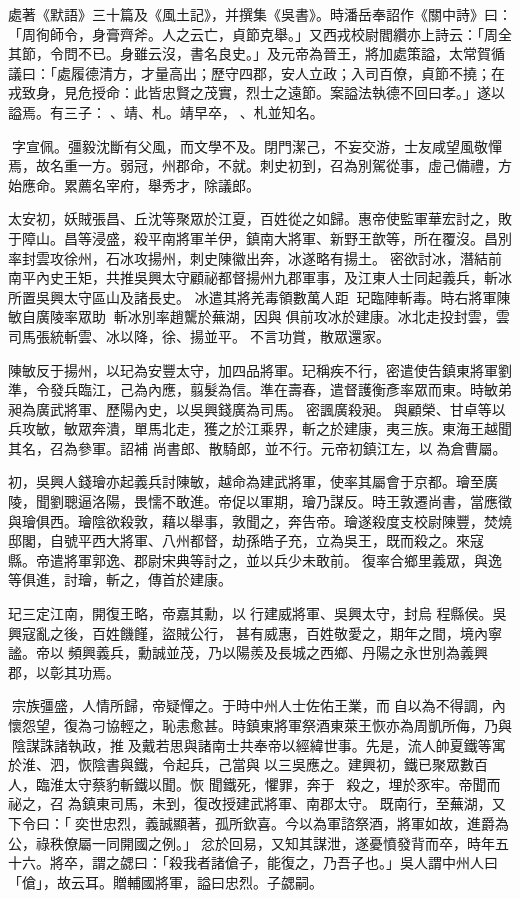 \begin{pinyinscope}
 處著《默語》三十篇及《風土記》，并撰集《吳書》。時潘岳奉詔作《關中詩》曰：「周徇師令，身膏齊斧。人之云亡，貞節克舉。」又西戎校尉閻纘亦上詩云：「周全其節，令問不已。身雖云沒，書名良史。」及元帝為晉王，將加處策謚，太常賀循議曰：「處履德清方，才量高出；歷守四郡，安人立政；入司百僚，貞節不撓；在戎致身，見危授命：此皆忠賢之茂實，烈士之遠節。案謚法執德不回曰孝。」遂以謚焉。有三子：、靖、札。靖早卒，、札並知名。



 字宣佩。彊毅沈斷有父風，而文學不及。閉門潔己，不妄交游，士友咸望風敬憚焉，故名重一方。弱冠，州郡命，不就。刺史初到，召為別駕從事，虛己備禮，方始應命。累薦名宰府，舉秀才，除議郎。



 太安初，妖賊張昌、丘沈等聚眾於江夏，百姓從之如歸。惠帝使監軍華宏討之，敗于障山。昌等浸盛，殺平南將軍羊伊，鎮南大將軍、新野王歆等，所在覆沒。昌別率封雲攻徐州，石冰攻揚州，刺史陳徽出奔，冰遂略有揚土。密欲討冰，潛結前南平內史王矩，共推吳興太守顧祕都督揚州九郡軍事，及江東人士同起義兵，斬冰所置吳興太守區山及諸長史。
 冰遣其將羌毒領數萬人距，玘臨陣斬毒。時右將軍陳敏自廣陵率眾助，斬冰別率趙驡於蕪湖，因與俱前攻冰於建康。冰北走投封雲，雲司馬張統斬雲、冰以降，徐、揚並平。不言功賞，散眾還家。



 陳敏反于揚州，以玘為安豐太守，加四品將軍。玘稱疾不行，密遣使告鎮東將軍劉準，令發兵臨江，己為內應，翦髮為信。準在壽春，遣督護衡彥率眾而東。時敏弟昶為廣武將軍、歷陽內史，以吳興錢廣為司馬。密諷廣殺昶。與顧榮、甘卓等以兵攻敏，敏眾奔潰，單馬北走，獲之於江乘界，斬之於建康，夷三族。東海王越聞其名，召為參軍。詔補
 尚書郎、散騎郎，並不行。元帝初鎮江左，以為倉曹屬。



 初，吳興人錢璯亦起義兵討陳敏，越命為建武將軍，使率其屬會于京都。璯至廣陵，聞劉聰逼洛陽，畏懦不敢進。帝促以軍期，璯乃謀反。時王敦遷尚書，當應徵與璯俱西。璯陰欲殺敦，藉以舉事，敦聞之，奔告帝。璯遂殺度支校尉陳豐，焚燒邸閣，自號平西大將軍、八州都督，劫孫皓子充，立為吳王，既而殺之。來寇縣。帝遣將軍郭逸、郡尉宋典等討之，並以兵少未敢前。復率合鄉里義眾，與逸等俱進，討璯，斬之，傳首於建康。



 玘三定江南，開復王略，帝嘉其勳，以行建威將軍、吳興太守，封烏
 程縣侯。吳興寇亂之後，百姓饑饉，盜賊公行，甚有威惠，百姓敬愛之，期年之間，境內寧謐。帝以頻興義兵，勳誠並茂，乃以陽羨及長城之西鄉、丹陽之永世別為義興郡，以彰其功焉。



 宗族彊盛，人情所歸，帝疑憚之。于時中州人士佐佑王業，而自以為不得調，內懷怨望，復為刁協輕之，恥恚愈甚。時鎮東將軍祭酒東萊王恢亦為周凱所侮，乃與陰謀誅諸執政，推及戴若思與諸南士共奉帝以經緯世事。先是，流人帥夏鐵等寓於淮、泗，恢陰書與鐵，令起兵，己當與以三吳應之。建興初，鐵已聚眾數百人，臨淮太守蔡豹斬鐵以聞。恢
 聞鐵死，懼罪，奔于，殺之，埋於豕牢。帝聞而祕之，召為鎮東司馬，未到，復改授建武將軍、南郡太守。既南行，至蕪湖，又下令曰：「奕世忠烈，義誠顯著，孤所欽喜。今以為軍諮祭酒，將軍如故，進爵為公，祿秩僚屬一同開國之例。」忿於回易，又知其謀泄，遂憂憤發背而卒，時年五十六。將卒，謂之勰曰：「殺我者諸傖子，能復之，乃吾子也。」吳人謂中州人曰「傖」，故云耳。贈輔國將軍，謚曰忠烈。子勰嗣。




\end{pinyinscope}
